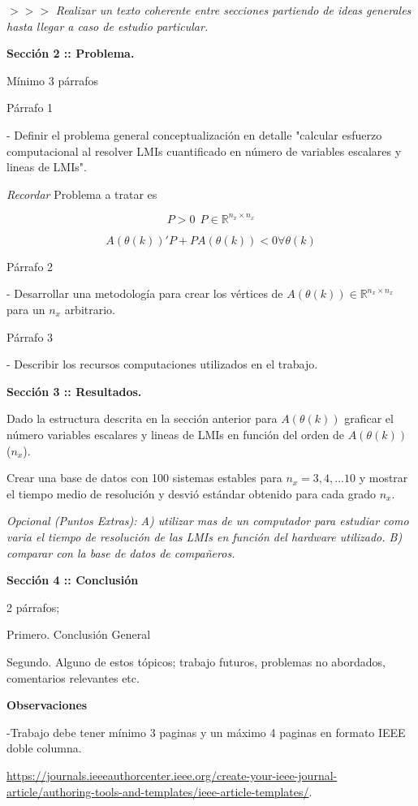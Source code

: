 \documentclass[10pt,a4paper]{article}
\begin{document}
 $>>>$ {\em Realizar un texto coherente  entre secciones partiendo  de ideas generales hasta llegar a caso de estudio particular.}


\textbf{Sección 2 :: Problema.}

Mínimo 3 párrafos

Párrafo 1

- Definir el problema general conceptualización en detalle "calcular esfuerzo computacional al  resolver LMIs cuantificado en n\'umero de variables escalares y lineas de LMIs".

{\em Recordar} Problema a tratar es 

$$P>0 ~~ P \in \mathbb{R}^{n_x \times n_x}$$

$$ A(\theta(k))'P + P A(\theta(k))<0  \forall   \theta(k) $$

Párrafo 2

- Desarrollar una metodología para crear los vértices de  $A(\theta(k)) \in \mathbb{R}^{n_x \times n_x}$ para un $n_x$ arbitrario.

Párrafo 3

- Describir los recursos computaciones utilizados en el trabajo. 

\textbf{Sección 3 :: Resultados.}

Dado la estructura descrita en la sección anterior para   $A(\theta(k))$ graficar  el n\'umero variables escalares y lineas de LMIs en función del orden de $A(\theta(k))$ ($n_x$).

Crear una base de datos con 100 sistemas estables para $n_x=3,4,...10$ y mostrar  el tiempo medio de resolución y desvió estándar obtenido para  cada grado $n_x$.

{\em Opcional (Puntos Extras): A) utilizar mas de un computador para estudiar como varia el tiempo de resolución de las LMIs en función del hardware utilizado. B) comparar con la base de datos de compañeros.}


\textbf{Sección 4 :: Conclusión}

2 párrafos;

Primero. Conclusión General

Segundo. Alguno de estos tópicos; trabajo futuros, problemas no abordados, comentarios relevantes etc. 


\textbf{Observaciones}

-Trabajo debe tener mínimo 3 paginas y un máximo 4 paginas en formato IEEE doble columna.

 \url{https://journals.ieeeauthorcenter.ieee.org/create-your-ieee-journal-article/authoring-tools-and-templates/ieee-article-templates/}.
\end{document}
